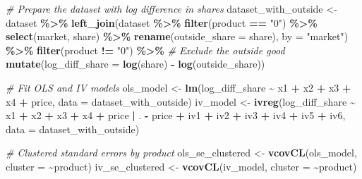 \documentclass[
]{article}
\newenvironment{Shaded}{\begin{snugshade}}{\end{snugshade}}
\newcommand{\AttributeTok}[1]{\textcolor[rgb]{0.13,0.29,0.53}{#1}}
\newcommand{\CommentTok}[1]{\textcolor[rgb]{0.56,0.35,0.01}{\textit{#1}}}
\newcommand{\FunctionTok}[1]{\textcolor[rgb]{0.13,0.29,0.53}{\textbf{#1}}}
\newcommand{\NormalTok}[1]{#1}
\newcommand{\OtherTok}[1]{\textcolor[rgb]{0.56,0.35,0.01}{#1}}
\newcommand{\SpecialCharTok}[1]{\textcolor[rgb]{0.81,0.36,0.00}{\textbf{#1}}}
\newcommand{\StringTok}[1]{\textcolor[rgb]{0.31,0.60,0.02}{#1}}
\begin{document}
\begin{Shaded}
\begin{Highlighting}[]
\CommentTok{\# Prepare the dataset with log difference in shares}
\NormalTok{dataset\_with\_outside }\OtherTok{\textless{}{-}}\NormalTok{ dataset }\SpecialCharTok{\%\textgreater{}\%}
  \FunctionTok{left\_join}\NormalTok{(dataset }\SpecialCharTok{\%\textgreater{}\%}
              \FunctionTok{filter}\NormalTok{(product }\SpecialCharTok{==} \StringTok{"0"}\NormalTok{) }\SpecialCharTok{\%\textgreater{}\%}
              \FunctionTok{select}\NormalTok{(market, share) }\SpecialCharTok{\%\textgreater{}\%}
              \FunctionTok{rename}\NormalTok{(}\AttributeTok{outside\_share =}\NormalTok{ share), }
            \AttributeTok{by =} \StringTok{"market"}\NormalTok{) }\SpecialCharTok{\%\textgreater{}\%}
  \FunctionTok{filter}\NormalTok{(product }\SpecialCharTok{!=} \StringTok{"0"}\NormalTok{) }\SpecialCharTok{\%\textgreater{}\%}  \CommentTok{\# Exclude the outside good}
  \FunctionTok{mutate}\NormalTok{(}\AttributeTok{log\_diff\_share =} \FunctionTok{log}\NormalTok{(share) }\SpecialCharTok{{-}} \FunctionTok{log}\NormalTok{(outside\_share))}

\CommentTok{\# Fit OLS and IV models}
\NormalTok{ols\_model }\OtherTok{\textless{}{-}} \FunctionTok{lm}\NormalTok{(log\_diff\_share }\SpecialCharTok{\textasciitilde{}}\NormalTok{ x1 }\SpecialCharTok{+}\NormalTok{ x2 }\SpecialCharTok{+}\NormalTok{ x3 }\SpecialCharTok{+}\NormalTok{ x4 }\SpecialCharTok{+}\NormalTok{ price, }\AttributeTok{data =}\NormalTok{ dataset\_with\_outside)}
\NormalTok{iv\_model }\OtherTok{\textless{}{-}} \FunctionTok{ivreg}\NormalTok{(log\_diff\_share }\SpecialCharTok{\textasciitilde{}}\NormalTok{ x1 }\SpecialCharTok{+}\NormalTok{ x2 }\SpecialCharTok{+}\NormalTok{ x3 }\SpecialCharTok{+}\NormalTok{ x4 }\SpecialCharTok{+}\NormalTok{ price }\SpecialCharTok{|} 
\NormalTok{                    . }\SpecialCharTok{{-}}\NormalTok{ price }\SpecialCharTok{+}\NormalTok{ iv1 }\SpecialCharTok{+}\NormalTok{ iv2 }\SpecialCharTok{+}\NormalTok{ iv3 }\SpecialCharTok{+}\NormalTok{ iv4 }\SpecialCharTok{+}\NormalTok{ iv5 }\SpecialCharTok{+}\NormalTok{ iv6, }
                  \AttributeTok{data =}\NormalTok{ dataset\_with\_outside)}

\CommentTok{\# Clustered standard errors by product}
\NormalTok{ols\_se\_clustered }\OtherTok{\textless{}{-}} \FunctionTok{vcovCL}\NormalTok{(ols\_model, }\AttributeTok{cluster =} \SpecialCharTok{\textasciitilde{}}\NormalTok{product)}
\NormalTok{iv\_se\_clustered }\OtherTok{\textless{}{-}} \FunctionTok{vcovCL}\NormalTok{(iv\_model, }\AttributeTok{cluster =} \SpecialCharTok{\textasciitilde{}}\NormalTok{product)}
\end{Highlighting}
\end{Shaded}
\end{document}
